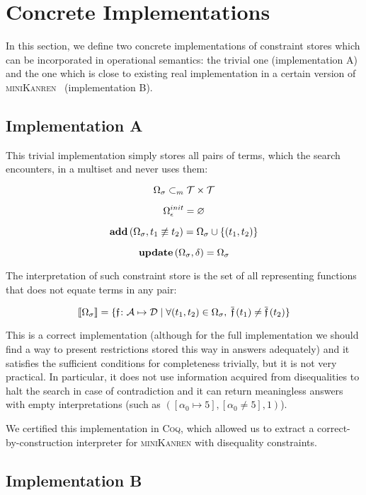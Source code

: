 \section{Concrete Implementations}

In this section, we define two concrete implementations of constraint stores which can be incorporated in operational semantics: the trivial one
(implementation A) and the one which is close to existing real implementation in a certain version of \textsc{miniKanren}~\cite{CKanren} (implementation B).

\subsection{Implementation A}

This trivial implementation simply stores all pairs of terms, which the search encounters, in a multiset and never uses them:

\[ \Omega_\sigma \subset_m \mathcal{T} \times \mathcal{T} \]

\[ \Omega_\epsilon^{init} = \varnothing \]

\[ \mathbf{add}\,(\Omega_\sigma, t_1 \not\equiv t_2) = \Omega_\sigma \cup \{(t_1, t_2)\} \]

\[ \mathbf{update}\,(\Omega_\sigma, \delta) = \Omega_\sigma \]

The interpretation of such constraint store is the set of all representing functions that does not equate terms in any pair:

\[ \llbracket{\Omega_\sigma}\rrbracket = \{\mathfrak{f} \colon \mathcal{A}\mapsto\mathcal{D} \mid \forall (t_1, t_2) \in \Omega_\sigma, \; \overline{\mathfrak{f}}\,(t_1) \neq \overline{\mathfrak{f}}\,(t_2)\} \]

This is a correct implementation (although for the full implementation we should find a way to present restrictions stored this way
in answers adequately) and it satisfies the sufficient conditions for completeness trivially, but it is not very practical.
In particular, it does not use information acquired
from disequalities to halt the search in case of contradiction and it can return meaningless answers with empty interpretations
(such as $([\alpha_0 \mapsto 5], [\alpha_0 \neq 5], 1)$).

We certified this implementation in \textsc{Coq}, which allowed us to extract a correct-by-construction interpreter for \textsc{miniKanren} with
disequality constraints.

\subsection{Implementation B}

